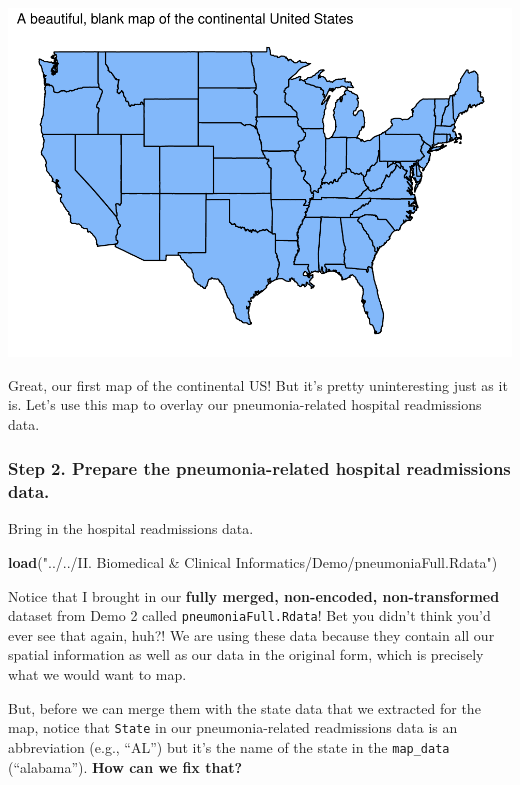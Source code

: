\documentclass[
]{article}
\newenvironment{Shaded}{\begin{snugshade}}{\end{snugshade}}
\newcommand{\FunctionTok}[1]{\textcolor[rgb]{0.13,0.29,0.53}{\textbf{#1}}}
\newcommand{\NormalTok}[1]{#1}
\newcommand{\StringTok}[1]{\textcolor[rgb]{0.31,0.60,0.02}{#1}}
\begin{document}
\includegraphics{Demo3_files/figure-latex/unnamed-chunk-2-1.pdf}

Great, our first map of the continental US! But it's pretty
uninteresting just as it is. Let's use this map to overlay our
pneumonia-related hospital readmissions data.

\subsubsection{Step 2. Prepare the pneumonia-related hospital
readmissions
data.}\label{step-2.-prepare-the-pneumonia-related-hospital-readmissions-data.}

Bring in the hospital readmissions data.

\begin{Shaded}
\begin{Highlighting}[]
\FunctionTok{load}\NormalTok{(}\StringTok{"../../II. Biomedical \& Clinical Informatics/Demo/pneumoniaFull.Rdata"}\NormalTok{)}
\end{Highlighting}
\end{Shaded}

Notice that I brought in our \textbf{fully merged, non-encoded,
non-transformed} dataset from Demo 2 called
\texttt{pneumoniaFull.Rdata}! Bet you didn't think you'd ever see that
again, huh?! We are using these data because they contain all our
spatial information as well as our data in the original form, which is
precisely what we would want to map.

But, before we can merge them with the state data that we extracted for
the map, notice that \texttt{State} in our pneumonia-related
readmissions data is an abbreviation (e.g., ``AL'') but it's the name of
the state in the \texttt{map\_data} (``alabama''). \textbf{How can we
fix that?}
\end{document}
